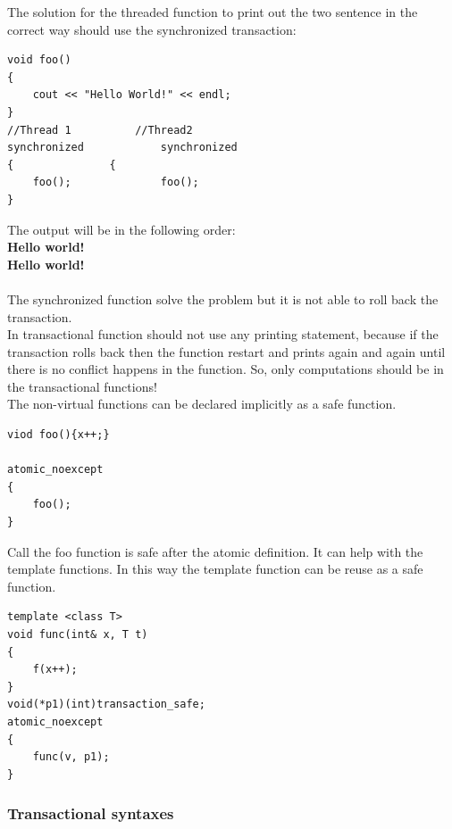\documentclass[12pt]{article}
\begin{document}
{\setlength{\parindent}{0cm}
The solution for the threaded function to print out the two sentence in the correct way should use the synchronized transaction:\\  
}
\begin{lstlisting}
void foo()
{
	cout << "Hello World!" << endl;
}
//Thread 1			//Thread2
synchronized			synchronized	
{				{
	foo();				foo();
}
\end{lstlisting}
{\setlength{\parindent}{0cm}
The output will be in the following order:\\
\textbf{Hello world!\\
Hello world!}\\\\
The synchronized function solve the problem but it is not able to roll back the transaction.\\

In transactional function should not use any printing statement, because if the transaction rolls back then the function restart and prints again and again until there is no conflict happens in the function. So, only computations should be in the transactional functions!\\

The non-virtual functions can be declared implicitly as a safe function.
}
\begin{lstlisting}
viod foo(){x++;}

atomic_noexcept
{
	foo();
}
\end{lstlisting}
{\setlength{\parindent}{0cm}
Call the foo function is safe after the atomic definition. It can help with the template functions. In this way the template function can be reuse as a safe function.
}
\begin{lstlisting}
template <class T>
void func(int& x, T t)
{
	f(x++);
}
void(*p1)(int)transaction_safe;
atomic_noexcept
{
	func(v, p1);
}
\end{lstlisting}
{\setlength{\parindent}{0cm}
\subsubsection{Transactional syntaxes}
}\cite{Hall}
\end{document}
